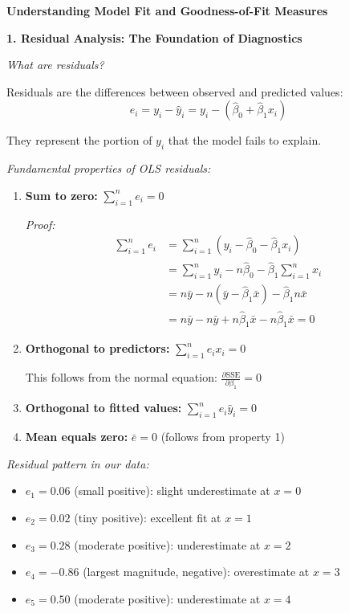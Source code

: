 \documentclass[12pt]{article}
\begin{document}
\begin{explanation}
\textbf{Understanding Model Fit and Goodness-of-Fit Measures}

\textbf{1. Residual Analysis: The Foundation of Diagnostics}

\textit{What are residuals?}

Residuals are the differences between observed and predicted values:
\[
e_i = y_i - \hat{y}_i = y_i - (\hat{\beta}_0 + \hat{\beta}_1 x_i)
\]

They represent the portion of $y_i$ that the model fails to explain.

\textit{Fundamental properties of OLS residuals:}

\begin{enumerate}
    \item \textbf{Sum to zero:} $\sum_{i=1}^{n} e_i = 0$

    \textit{Proof:}
    \begin{align*}
    \sum_{i=1}^{n} e_i &= \sum_{i=1}^{n}(y_i - \hat{\beta}_0 - \hat{\beta}_1 x_i) \\
    &= \sum_{i=1}^{n} y_i - n\hat{\beta}_0 - \hat{\beta}_1\sum_{i=1}^{n} x_i \\
    &= n\bar{y} - n(\bar{y} - \hat{\beta}_1\bar{x}) - \hat{\beta}_1 n\bar{x} \\
    &= n\bar{y} - n\bar{y} + n\hat{\beta}_1\bar{x} - n\hat{\beta}_1\bar{x} = 0
    \end{align*}

    \item \textbf{Orthogonal to predictors:} $\sum_{i=1}^{n} e_i x_i = 0$

    This follows from the normal equation: $\frac{\partial \text{SSE}}{\partial \beta_1} = 0$

    \item \textbf{Orthogonal to fitted values:} $\sum_{i=1}^{n} e_i \hat{y}_i = 0$

    \item \textbf{Mean equals zero:} $\bar{e} = 0$ (follows from property 1)
\end{enumerate}

\textit{Residual pattern in our data:}

\begin{itemize}
    \item $e_1 = 0.06$ (small positive): slight underestimate at $x = 0$
    \item $e_2 = 0.02$ (tiny positive): excellent fit at $x = 1$
    \item $e_3 = 0.28$ (moderate positive): underestimate at $x = 2$
    \item $e_4 = -0.86$ (largest magnitude, negative): overestimate at $x = 3$
    \item $e_5 = 0.50$ (moderate positive): underestimate at $x = 4$
\end{itemize}


\end{explanation}
\end{document}
